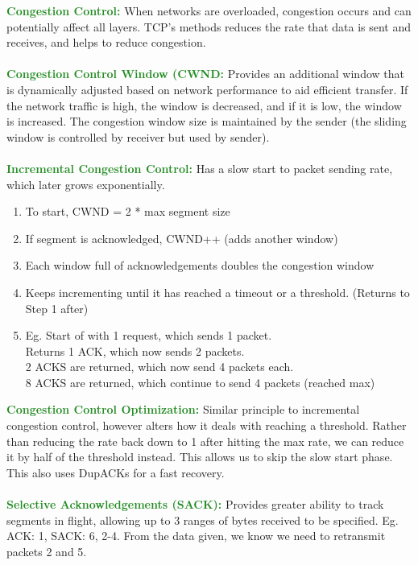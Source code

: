 \documentclass[a4paper,10pt]{article}
\begin{document}
\textcolor{ForestGreen}{\textbf{Congestion Control:}} When networks are overloaded, congestion occurs and can potentially affect all layers. TCP's methods reduces the rate that data is sent and receives, and helps to reduce congestion. \\\\
\textcolor{ForestGreen}{\textbf{Congestion Control Window (CWND:}} Provides an additional window that is dynamically adjusted based on network performance  to aid efficient transfer. If the network traffic is high, the window is decreased, and if it is low, the window is increased. The congestion window size is maintained by the sender (the sliding window is controlled by receiver but used by sender). \\\\
\textcolor{ForestGreen}{\textbf{Incremental Congestion Control:}} Has a slow start to packet sending rate, which later grows exponentially.  
\begin{enumerate}
	\item To start, CWND = 2 * max segment size
	\item If segment is acknowledged, CWND++ (adds another window)
	\item Each window full of acknowledgements doubles the congestion window 
	\item Keeps incrementing until it has reached a timeout or a threshold. (Returns to Step 1 after) 
	\item Eg. Start of with 1 request, which sends 1 packet. \\ 
	          Returns 1 ACK, which now sends 2 packets. \\
	          2 ACKS are returned, which now send 4 packets each. \\
	          8 ACKS are returned, which continue to send 4 packets (reached max) \\
\end{enumerate}
\textcolor{ForestGreen}{\textbf{Congestion Control Optimization:}} Similar principle to incremental congestion control, however alters how it deals with reaching a threshold. Rather than reducing the rate back down to 1 after hitting the max rate, we can reduce it by half of the threshold instead. This allows us to skip the slow start phase. This also uses DupACKs for a fast recovery. \\\\
\textcolor{ForestGreen}{\textbf{Selective Acknowledgements (SACK):}} Provides greater ability to track segments in flight, allowing up to 3 ranges of bytes received to be specified. Eg. ACK: 1, SACK: 6, 2-4. From the data given, we know we need to retransmit packets 2 and 5. \\\\ 
\end{document}
